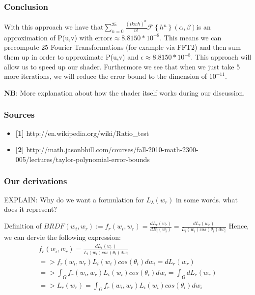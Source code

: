 \subsubsection{Conclusion}

With this approach we have that$\sum_{n=0}^{25}\frac{(ikwh)^{n}}{n!}\mathcal{F}\left\{ h{}^{n}\right\} (\alpha,\beta)$is
an approximation of P(u,v) with error$\epsilon\approx8.8150*10^{-8}$.
This means we can precompute 25 Fourier Transformations (for example
via FFT2) and then sum them up in order to approximate P(u,v) and
$\epsilon\approx8.8150*10^{-8}$. This approach will allow us to speed
up our shader. Furthermore we see that when we just take 5 more iterations,
we will reduce the error bound to the dimension of $10^{-11}$.

\textbf{NB}: More explanation about how the shader itself works during
our discussion.


\subsubsection{Sources}
\begin{itemize}
\item \textbf{{[}1{]}} http://en.wikipedia.org/wiki/Ratio\_test
\item \textbf{{[}2{]}} http://math.jasonbhill.com/courses/fall-2010-math-2300-005/lectures/taylor-polynomial-error-bounds\end{itemize}




\subsubsection{Our derivations}

EXPLAIN: Why do we want a formulation for $L_{\lambda}(w_r)$ in some words. what does it represent?

Definition of $BRDF(w_i, w_r) := f_r(w_i, w_r) = \frac{dL_r(w_r)}{dE_i(w_i)}=\frac{dL_r(w_r)}{L_i(w_i)cos(\theta_i)dw_i}$  
Hence, we can dervie the following expression:
\begin{align*}
f_r(w_i, w_r) = \frac{dL_r(w_r)}{L_i(w_i)cos(\theta_i)dw_i} \\
=> f_r(w_i, w_r) L_i(w_i)cos(\theta_i)dw_i = dL_r(w_r) \\
=> \int_{\Omega}f_r(w_i, w_r) L_i(w_i)cos(\theta_i)dw_i = \int_{\Omega}dL_r(w_r) \\
=> L_r(w_r) = \int_{\Omega}f_r(w_i, w_r) L_i(w_i)cos(\theta_i)dw_i
\end{align*}


